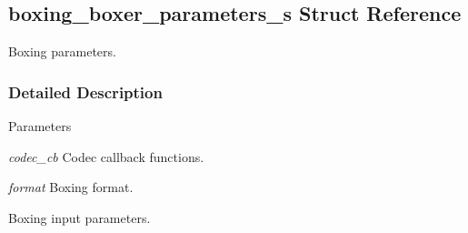 \hypertarget{structboxing__boxer__parameters__s}{
\subsection{boxing\_\-boxer\_\-parameters\_\-s Struct Reference}
\label{structboxing__boxer__parameters__s}
}


Boxing parameters.  


\subsubsection{Detailed Description}

\begin{DoxyParams}{Parameters}
\item[{\em codec\_\-cb}]Codec callback functions. \item[{\em format}]Boxing format.\end{DoxyParams}
Boxing input parameters. 